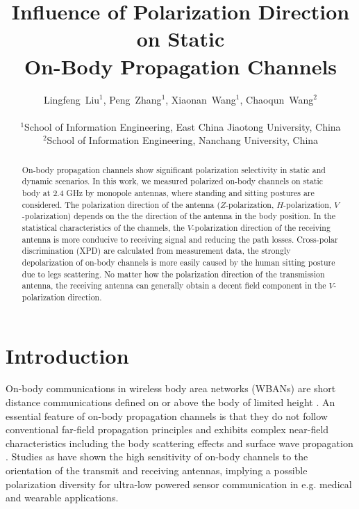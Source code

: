 \documentclass[conference]{IEEEtran}
\begin{document}
\title{Influence of Polarization Direction on Static \\ On-Body Propagation Channels}
\author{Lingfeng~Liu$^1$, Peng~Zhang$^1$, Xiaonan~Wang$^1$, Chaoqun~Wang$^2$\\
\\
$^1$School of Information Engineering, East China Jiaotong University, China \\
$^2$School of Information Engineering,  Nanchang University, China}

\maketitle
\begin{abstract}
On-body propagation channels show significant polarization selectivity in static and dynamic scenarios. In this work, we measured polarized on-body channels on static body at 2.4 GHz by monopole antennas, where standing and sitting postures are considered. The polarization direction of the antenna ($Z$-polarization, $H$-polarization, $V$-polarization) depends on the the direction of the antenna in the body position. In the statistical characteristics of the channels, the $V$-polarization direction of the receiving antenna is more conducive to receiving signal and reducing the path losses. Cross-polar discrimination (XPD) are calculated from measurement data, the strongly depolarization of on-body channels is more easily caused by the human sitting posture due to legs scattering. No matter how the polarization direction of the transmission antenna, the receiving antenna can generally obtain a decent field component in the $V$-polarization direction.
\end{abstract}

\section{Introduction}
On-body communications in wireless body area networks (WBANs) are short distance communications defined on or above the body of limited height \cite{1}. An essential feature of on-body propagation channels is that they do not follow conventional far-field propagation principles and exhibits complex near-field characteristics including the body scattering effects\cite{2,3} and surface wave propagation \cite{5}. Studies as \cite{6} have shown the high sensitivity of on-body channels to the orientation of the transmit and receiving antennas, implying a possible polarization diversity for ultra-low powered sensor communication in e.g. medical and wearable applications.
\end{document}
